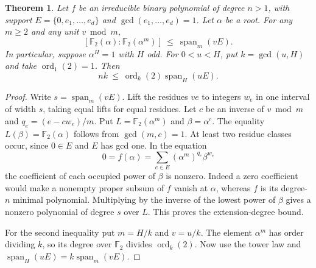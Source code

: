 \documentclass[11pt]{article}
\newtheorem{theorem}{Theorem}
\newcommand{\F}{\mathbb F_2}
\newcommand{\ord}{\operatorname{ord}}
\begin{document}
\begin{theorem}\label{thm:sparse-extension-span}
Let \(f\) be an irreducible binary polynomial of degree \(n>1\), with
support \(E=\{0,e_1,\ldots,e_d\}\) and \(\gcd(e_1,\ldots,e_d)=1\).
Let \(\alpha\) be a root. For any \(m\ge2\) and any unit \(v\bmod m\),
\[
 [\F(\alpha):\F(\alpha^m)]\ \le\
       \operatorname{span}_m(vE).
\]
In particular, suppose \(\alpha^H=1\) with \(H\) odd.
For \(0<u<H\), put \(k=\gcd(u,H)\) and take \(\ord_1(2)=1\).
Then
\[
       n k\ \le\ \ord_k(2)\operatorname{span}_H(uE).
\]
\end{theorem}
\begin{proof}
Write \(s=\operatorname{span}_m(vE)\). Lift the residues \(ve\) to
integers \(w_e\) in one interval of width \(s\), taking equal lifts for
equal residues. Let \(c\) be an inverse of \(v\bmod m\) and
\(q_e=(e-cw_e)/m\). Put \(L=\F(\alpha^m)\) and \(\beta=\alpha^c\).
The equality \(L(\beta)=\F(\alpha)\) follows from \(\gcd(m,c)=1\).
At least two residue classes occur, since \(0\in E\) and \(E\) has gcd one.
In the equation
\[
        0=f(\alpha)=\sum_{e\in E}(\alpha^m)^{q_e}\beta^{w_e}
\]
the coefficient of each occupied power of \(\beta\) is nonzero.
Indeed a zero coefficient would make a nonempty proper subsum of
\(f\) vanish at \(\alpha\), whereas \(f\) is its degree-\(n\) minimal
polynomial. Multiplying by the inverse of the lowest power of
\(\beta\) gives a nonzero polynomial of degree \(s\) over \(L\).
This proves the extension-degree bound.

For the second inequality put \(m=H/k\) and \(v=u/k\).
The element \(\alpha^m\) has order dividing \(k\), so its degree
over \(\F\) divides \(\ord_k(2)\). Now use the tower law and
\(\operatorname{span}_H(uE)=k\operatorname{span}_m(vE)\).
\end{proof}
\end{document}
